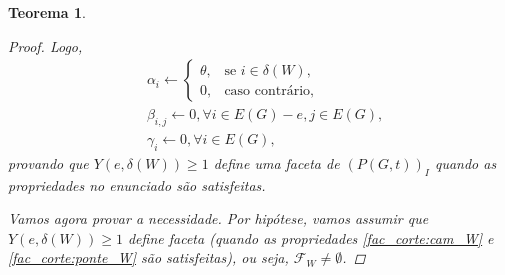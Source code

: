 \documentclass[11pt,reqno]{amsart}
\newtheorem{teorema}{Teorema}
\newcommand{\incid}{\mathcal{X}}
\newcommand{\incidY}{\mathcal{Y}}
\newcommand{\facetF}{\mathcal{F}}
\begin{document}
\begin{teorema}
\begin{proof}
Logo,
\begin{align*}
&\alpha_{i}\leftarrow
\begin{cases}
    \theta,& \text{se $i \in \delta(W)$},\\
    0,& \text{caso contrário},
\end{cases}\\
&\beta_{i,j}\leftarrow 0, \forall i \in E(G)-e, j \in E(G),\\
&\gamma_{i}\leftarrow 0, \forall i \in E(G),
\end{align*}
provando que $Y(e, \delta(W)) \ge 1$ define uma faceta de $(P(G,t))_{I}$ quando as 
propriedades no enunciado são satisfeitas.

Vamos agora provar a necessidade. Por hipótese, vamos assumir que 
$Y(e,\delta(W)) \ge 1$ define faceta (quando as propriedades \ref{fac_corte:cam_W} 
e \ref{fac_corte:ponte_W} são satisfeitas), ou seja, $\facetF_{W} \neq \emptyset$.





\end{proof}
\end{teorema}
\end{document}
